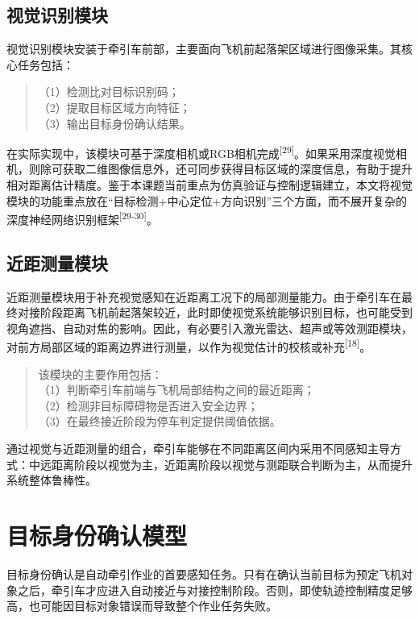 \subsection{视觉识别模块}

视觉识别模块安装于牵引车前部，主要面向飞机前起落架区域进行图像采集。其核心任务包括：

\begin{quote}
（1）检测比对目标识别码；\\
（2）提取目标区域方向特征；\\
（3）输出目标身份确认结果。
\end{quote}

在实际实现中，该模块可基于深度相机或RGB相机完成\textsuperscript{[29]}。如果采用深度视觉相机，则除可获取二维图像信息外，还可同步获得目标区域的深度信息，有助于提升相对距离估计精度。鉴于本课题当前重点为仿真验证与控制逻辑建立，本文将视觉模块的功能重点放在“目标检测+中心定位+方向识别”三个方面，而不展开复杂的深度神经网络识别框架\textsuperscript{[29-30]}。

\subsection{近距测量模块}

近距测量模块用于补充视觉感知在近距离工况下的局部测量能力。由于牵引车在最终对接阶段距离飞机前起落架较近，此时即使视觉系统能够识别目标，也可能受到视角遮挡、自动对焦的影响。因此，有必要引入激光雷达、超声或等效测距模块，对前方局部区域的距离边界进行测量，以作为视觉估计的校核或补充\textsuperscript{[18]}。

\begin{quote}
该模块的主要作用包括：\\
（1）判断牵引车前端与飞机局部结构之间的最近距离；\\
（2）检测非目标障碍物是否进入安全边界；\\
（3）在最终接近阶段为停车判定提供阈值依据。
\end{quote}

通过视觉与近距测量的组合，牵引车能够在不同距离区间内采用不同感知主导方式：中远距离阶段以视觉为主，近距离阶段以视觉与测距联合判断为主，从而提升系统整体鲁棒性。

\section{目标身份确认模型}

目标身份确认是自动牵引作业的首要感知任务。只有在确认当前目标为预定飞机对象之后，牵引车才应进入自动接近与对接控制阶段。否则，即使轨迹控制精度足够高，也可能因目标对象错误而导致整个作业任务失败。

